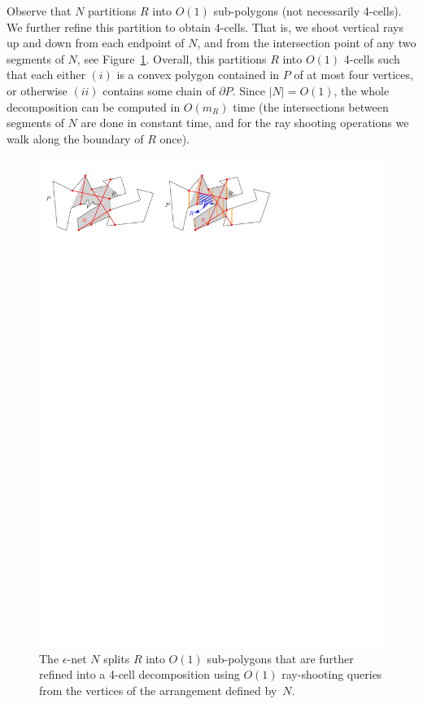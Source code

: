 \documentclass[a4paper,UKenglish]{lipics}
\newcommand{\m}{\ensuremath{m_{\scriptscriptstyle R}}}
\newcommand{\tcell}{4-cell\xspace}
\newcommand{\tcells}{4-cells\xspace}
\begin{document}
Observe that $N$ partitions $R$ into $O(1)$ sub-polygons (not necessarily \tcells). We further refine this partition to obtain \tcells. That is, we shoot vertical rays up and down from each endpoint of $N$, and from the intersection point of  any two segments of $N$, see Figure~\ref{fig:Cutting of Chords}. Overall, this partitions $R$ into $O(1)$ \tcells such that each  either $(i)$  is a convex polygon contained in $P$ of at most four vertices, or otherwise $(ii)$ contains some chain of $\partial P$. 
Since $|N| = O(1)$, the whole decomposition can be computed in $O(\m)$ time (the intersections between segments of $N$ are done in constant time, and for the ray shooting operations we walk along the boundary of $R$ once).

\begin{figure}[tb]
\centering
\includegraphics{img/CuttingOfChords.pdf}

\caption{\small The $\epsilon$-net $N$ splits $R$ into $O(1)$ sub-polygons that are further refined into a \tcell decomposition using $O(1)$ ray-shooting queries from the vertices of the arrangement defined by~$N$.}
\label{fig:Cutting of Chords}
\end{figure}
\end{document}
